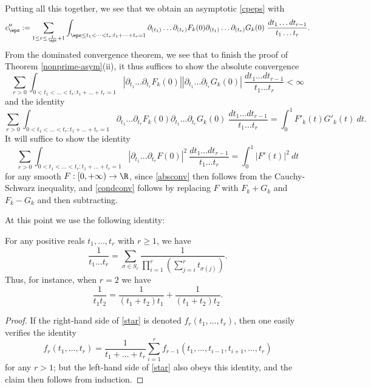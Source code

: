 Putting all this together, we see that we obtain an asymptotic \eqref{cpeps} with
$$ c''_\eps := \sum_{1 \leq r \leq \frac{1}{\eps}+1} 
\int_{\eps \leq t_1 < \dots < t_r: t_1 + \dots + t_r = 1} \partial_{(t_1)} \dots \partial_{(t_r)} F_k(0)
\partial_{(t_1)} \dots \partial_{(t_r)} G_k(0)\ \frac{dt_1 \dots dt_{r-1}}{t_1 \dots t_r}.$$
From the dominated convergence theorem, we see that to finish the proof of Theorem \ref{nonprime-asym}(ii), it thus suffices to show the absolute convergence
\begin{equation}\label{absconv}
 \sum_{r>0} \int_{0 < t_1 < \dots < t_r: t_1 + \dots + t_r = 1} |\partial_{t_1} \dots \partial_{t_r} F_k(0)|
|\partial_{t_1} \dots \partial_{t_r} G_k(0)|\ \frac{dt_1 \dots dt_{r-1}}{t_1 \dots t_r} < \infty
\end{equation}
and the identity
\begin{equation}\label{condconv}
 \sum_{r>0} \int_{0 < t_1 < \dots < t_r: t_1 + \dots + t_r = 1} \partial_{t_1} \dots \partial_{t_r} F_k(0)
\partial_{t_1} \dots \partial_{t_r} G_k(0)\ \frac{dt_1 \dots dt_{r-1}}{t_1 \dots t_r} = \int_0^1 F'_k(t) G'_k(t)\ dt.
\end{equation}
It will suffice to show the identity
\begin{equation}\label{depol}
 \sum_{r>0} \int_{0 < t_1 < \dots < t_r: t_1 + \dots + t_r = 1} |\partial_{t_1} \dots \partial_{t_r} F(0)|^2\ \frac{dt_1 \dots dt_{r-1}}{t_1 \dots t_r} = \int_0^1 |F'(t)|^2\ dt
\end{equation}
for any smooth $F: [0,+\infty) \to \R$, since \eqref{absconv} then follows from the Cauchy-Schwarz inequality, and \eqref{condconv} follows by replacing $F$ with $F_k+G_k$ and $F_k-G_k$ and then subtracting.

At this point we use the following identity:

\begin{lemma}  For any positive reals $t_1,\dots,t_r$ with $r \geq 1$, we have
\begin{equation}\label{star}
 \frac{1}{t_1 \dots t_r} = \sum_{\sigma \in S_r} \frac{1}{\prod_{i=1}^r (\sum_{j=i}^r t_{\sigma(j)})}.
\end{equation}
Thus, for instance, when $r=2$ we have
$$ \frac{1}{t_1 t_2} = \frac{1}{(t_1+t_2) t_1} + \frac{1}{(t_1+t_2)t_2}.$$
\end{lemma}

\begin{proof}  If the right-hand side of \eqref{star} is denoted $f_r( t_1,\dots,t_r )$, then one easily verifies the identity
$$ f_r(t_1,\dots,t_r) = \frac{1}{t_1+\dots+t_r} \sum_{i=1}^r f_{r-1}(t_1,\dots,t_{i-1},t_{i+1},\dots,t_r)$$
for any $r > 1$; but the left-hand side of \eqref{star} also obeys this identity, and the claim then follows from induction.
\end{proof}

